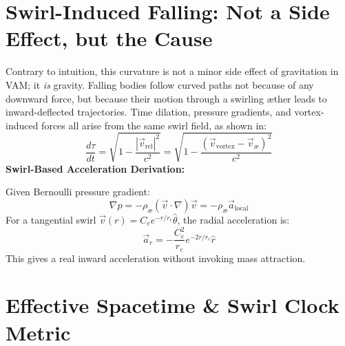 \documentclass[11pt]{article}
\begin{document}
    \section*{Swirl-Induced Falling: Not a Side Effect, but the Cause}

    Contrary to intuition, this curvature is not a minor side effect of gravitation in VAM; it \textit{is} gravity. Falling bodies follow curved paths not because of any downward force, but because their motion through a swirling \ae ther leads to inward-deflected trajectories. Time dilation, pressure gradients, and vortex-induced forces all arise from the same swirl field, as shown in:
    \begin{equation}
        \frac{d\tau}{dt} = \sqrt{1 - \frac{|\vec{v}_\text{rel}|^2}{c^2}} = \sqrt{1 - \frac{(\vec{v}_\text{vortex} - \vec{v}_\text{\ae})^2}{c^2}}
    \end{equation}
    \textbf{Swirl-Based Acceleration Derivation:}

    Given Bernoulli pressure gradient:
    \begin{equation}
        \nabla p = - \rho_\text{\ae} (\vec{v} \cdot \nabla) \vec{v} = - \rho_\text{\ae} \vec{a}_\text{local}
    \end{equation}
    For a tangential swirl $\vec{v}(r) = C_e e^{-r/r_c} \hat{\theta}$, the radial acceleration is:
    \begin{equation}
        \vec{a}_r = -\frac{C_e^2}{r_c} e^{-2r/r_c} \hat{r}
    \end{equation}
    This gives a real inward acceleration without invoking mass attraction.

    \begin{center}
    \end{center}

    \section*{Effective Spacetime \& Swirl Clock Metric}
\end{document}
